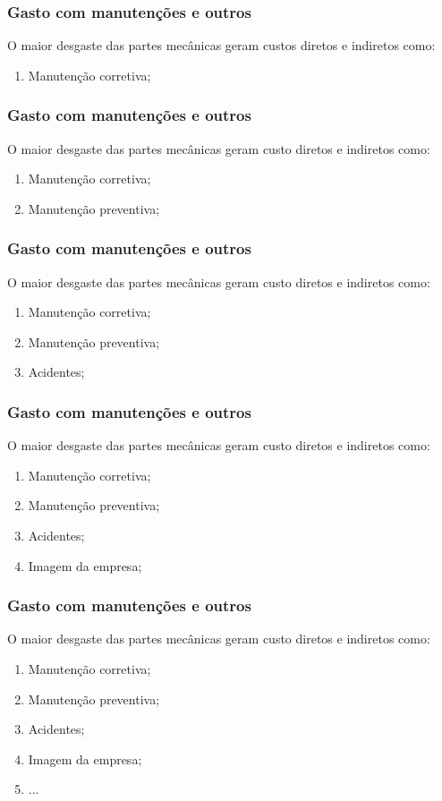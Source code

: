 \documentclass{beamer}
\begin{document}
\begin{frame}
\frametitle{Gasto com manutenções e outros}
O maior desgaste das partes mecânicas geram custos diretos e indiretos como:
\begin{enumerate}
	\item Manutenção corretiva;
\end{enumerate}
\end{frame}

\begin{frame}
\frametitle{Gasto com manutenções e outros}
O maior desgaste das partes mecânicas geram custo diretos e indiretos como:
\begin{enumerate}
	\item Manutenção corretiva;
	\item Manutenção preventiva;
\end{enumerate}
\end{frame}

\begin{frame}
\frametitle{Gasto com manutenções e outros}
O maior desgaste das partes mecânicas geram custo diretos e indiretos como:
\begin{enumerate}
	\item Manutenção corretiva;
	\item Manutenção preventiva;
	\item Acidentes;
\end{enumerate}
\end{frame}

\begin{frame}
\frametitle{Gasto com manutenções e outros}
O maior desgaste das partes mecânicas geram custo diretos e indiretos como:
\begin{enumerate}
	\item Manutenção corretiva;
	\item Manutenção preventiva;
	\item Acidentes;
	\item Imagem da empresa;
\end{enumerate}
\end{frame}

\begin{frame}
\frametitle{Gasto com manutenções e outros}
O maior desgaste das partes mecânicas geram custo diretos e indiretos como:
\begin{enumerate}
	\item Manutenção corretiva;
	\item Manutenção preventiva;
	\item Acidentes;
	\item Imagem da empresa;
	\item ...
\end{enumerate}
\end{frame}
\end{document}
